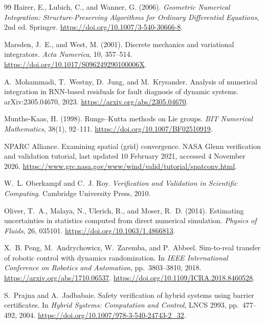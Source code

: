 \documentclass[10pt]{article}
\theoremstyle{definition}
\begin{document}
\begin{thebibliography}{99}
Hairer, E., Lubich, C., and Wanner, G. (2006).
\emph{Geometric Numerical Integration: Structure-Preserving Algorithms for
Ordinary Differential Equations}, 2nd ed. Springer.
\newblock \url{https://doi.org/10.1007/3-540-30666-8}.

Marsden, J.~E., and West, M. (2001). Discrete mechanics and variational
integrators. \emph{Acta Numerica}, 10, 357--514.
\newblock \url{https://doi.org/10.1017/S096249290100006X}.

A.~Mohammadi, T.~Westny, D.~Jung, and M.~Krysander.
\newblock Analysis of numerical integration in RNN-based residuals for fault
 diagnosis of dynamic systems.
\newblock arXiv:2305.04670, 2023. \url{https://arxiv.org/abs/2305.04670}.

Munthe-Kaas, H. (1998). Runge--Kutta methods on Lie groups. \emph{BIT
Numerical Mathematics}, 38(1), 92--111.
\newblock \url{https://doi.org/10.1007/BF02510919}.

NPARC Alliance.
\newblock Examining spatial (grid) convergence.
\newblock NASA Glenn verification and validation tutorial, last updated 10 February
2021, accessed 4 November 2026.
\newblock \url{https://www.grc.nasa.gov/www/wind/valid/tutorial/spatconv.html}.

W.~L. Oberkampf and C.~J. Roy.
\newblock \emph{Verification and Validation in Scientific Computing}.
\newblock Cambridge University Press, 2010.

Oliver, T.~A., Malaya, N., Ulerich, R., and Moser, R.~D. (2014).
Estimating uncertainties in statistics computed from direct numerical simulation.
\emph{Physics of Fluids}, 26, 035101.
\newblock \url{https://doi.org/10.1063/1.4866813}.

X.~B. Peng, M.~Andrychowicz, W.~Zaremba, and P.~Abbeel.
\newblock Sim-to-real transfer of robotic control with dynamics randomization.
\newblock In \emph{IEEE International Conference on Robotics and Automation},
pp.~3803--3810, 2018. \url{https://arxiv.org/abs/1710.06537}.
\newblock \url{https://doi.org/10.1109/ICRA.2018.8460528}.

S.~Prajna and A.~Jadbabaie.
\newblock Safety verification of hybrid systems using barrier certificates.
\newblock In \emph{Hybrid Systems: Computation and Control}, LNCS 2993,
pp.~477--492, 2004.
\newblock \url{https://doi.org/10.1007/978-3-540-24743-2_32}.


\end{thebibliography}
\end{document}
